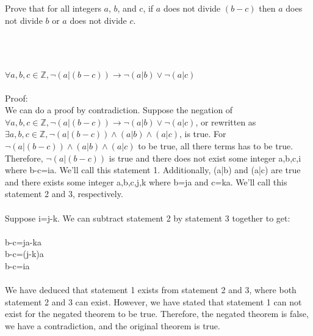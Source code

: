 \item[6] Prove that for all integers $a$, $b$, and $c$, if $a$ does not divide $(b-c)$ then $a$ does not divide $b$ or $a$ does not divide $c$.
\begin{Questions}
\\
\\
{\color{NavyBlue}
\\$\forall a,b,c\in\mathbb{Z}, \lnot (a | (b-c)) \rightarrow \lnot (a|b) \lor \lnot (a|c)$
\\
\\Proof:
\\ We can do a proof by contradiction. Suppose the negation of $\forall a,b,c\in\mathbb{Z}, \lnot (a | (b-c)) \rightarrow \lnot (a|b) \lor \lnot (a|c)$, or rewritten as $\exists a,b,c\in\mathbb{Z}, \lnot (a | (b-c)) \land (a|b) \land (a|c)$, is true. For $\lnot (a | (b-c)) \land (a|b) \land (a|c)$ to be true, all there terms has to be true. Therefore, $\lnot (a | (b-c))$ is true and there does not exist some integer a,b,c,i where b-c=ia. We'll call this statement 1. Additionally, (a|b) and (a|c) are true and there exists some integer a,b,c,j,k where b=ja and c=ka. We'll call this statement 2 and 3, respectively.
\\
\\Suppose i=j-k. We can subtract statement 2 by statement 3 together to get:
\\
\\b-c=ja-ka
\\b-c=(j-k)a
\\b-c=ia
\\
\\We have deduced that statement 1 exists from statement 2 and 3, where both statement 2 and 3 can exist. However, we have stated that statement 1 can not exist for the negated theorem to be true. Therefore, the negated theorem is false, we have a contradiction, and the original theorem is true.
\\
\\\boxed{}
}
\vfill\eject
\end{Questions}
